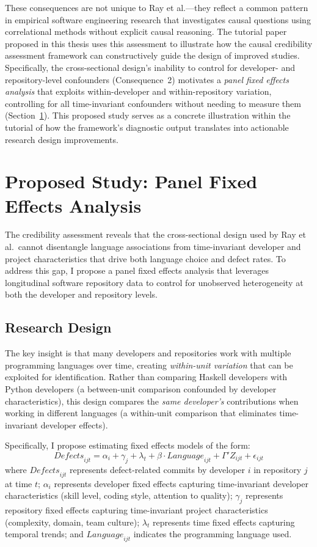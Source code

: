 These consequences are not unique to Ray et al.---they reflect a common pattern in empirical software engineering research that investigates causal questions using correlational methods without explicit causal reasoning.
The tutorial paper proposed in this thesis uses this assessment to illustrate how the causal credibility assessment framework can constructively guide the design of improved studies.
Specifically, the cross-sectional design's inability to control for developer- and repository-level confounders (Consequence~2) motivates a \emph{panel fixed effects analysis} that exploits within-developer and within-repository variation, controlling for all time-invariant confounders without needing to measure them (Section~\ref{sec:proposed-fe}).
This proposed study serves as a concrete illustration within the tutorial of how the framework's diagnostic output translates into actionable research design improvements.

\section{Proposed Study: Panel Fixed Effects Analysis}
\label{sec:proposed-fe}

The credibility assessment reveals that the cross-sectional design used by Ray et al.\ cannot disentangle language associations from time-invariant developer and project characteristics that drive both language choice and defect rates.
To address this gap, I propose a panel fixed effects analysis that leverages longitudinal software repository data to control for unobserved heterogeneity at both the developer and repository levels.

\subsection{Research Design}

The key insight is that many developers and repositories work with multiple programming languages over time, creating \emph{within-unit variation} that can be exploited for identification.
Rather than comparing Haskell developers with Python developers (a between-unit comparison confounded by developer characteristics), this design compares the \emph{same developer's} contributions when working in different languages (a within-unit comparison that eliminates time-invariant developer effects).

Specifically, I propose estimating fixed effects models of the form:
\begin{equation}
\textit{Defects}_{ijt} = \alpha_i + \gamma_j + \lambda_t + \beta \cdot \textit{Language}_{ijt} + \Gamma' Z_{ijt} + \epsilon_{ijt}
\end{equation}
where $\textit{Defects}_{ijt}$ represents defect-related commits by developer $i$ in repository $j$ at time $t$; $\alpha_i$ represents developer fixed effects capturing time-invariant developer characteristics (skill level, coding style, attention to quality); $\gamma_j$ represents repository fixed effects capturing time-invariant project characteristics (complexity, domain, team culture); $\lambda_t$ represents time fixed effects capturing temporal trends; and $\textit{Language}_{ijt}$ indicates the programming language used.


